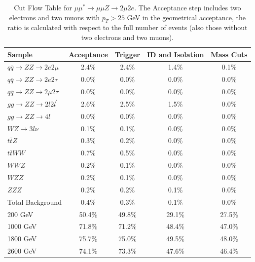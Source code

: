 \begin{table}[h]
\begin{center}
\begin{tabular}{|l|c|c|c|c|}
\hline
Sample & Acceptance & Trigger & ID and Isolation & Mass Cuts \\
\hline
\hline
$q\bar{q} \rightarrow ZZ \rightarrow 2e2\mu$ & 2.4\% & 2.4\% & 1.4\% & 0.1\% \\
$q\bar{q} \rightarrow ZZ \rightarrow 2e2\tau$ & 0.0\% & 0.0\% & 0.0\% & 0.0\% \\
$q\bar{q} \rightarrow ZZ \rightarrow 2\mu2\tau$ & 0.0\% & 0.0\% & 0.0\% & 0.0\% \\
$gg \rightarrow ZZ \rightarrow 2l2l^{\prime}$ & 2.6\% & 2.5\% & 1.5\% & 0.0\% \\
$gg \rightarrow ZZ \rightarrow 4l$ & 0.0\% & 0.0\% & 0.0\% & 0.0\% \\
$WZ \rightarrow 3l\nu$ & 0.1\% & 0.1\% & 0.0\% & 0.0\%\\
$t\bar{t}Z$ & 0.3\% & 0.2\% & 0.0\% & 0.0\% \\
$t\bar{t}WW$ & 0.7\% & 0.5\% & 0.0\% & 0.0\% \\
$WWZ$   & 0.2\% & 0.1\% & 0.0\% & 0.0\% \\
$WZZ$   & 0.2\% & 0.1\% & 0.0\% & 0.0\% \\
$ZZZ$   & 0.2\% & 0.2\% & 0.1\% & 0.0\% \\
\hline
\hline
Total Background & 0.4\% & 0.3\% & 0.1\% & 0.0\% \\
\hline
\hline
200 GeV & 50.4\% & 49.8\% & 29.1\% & 27.5\% \\
1000 GeV & 71.8\% & 71.2\% & 48.4\% & 47.0\% \\
1800 GeV & 75.7\% & 75.0\% & 49.5\% & 48.0\% \\
2600 GeV & 74.1\% & 73.3\% & 47.6\% & 46.4\% \\
\hline
\end{tabular}
\end{center}
\caption{\label{tab:CutFlow_2mu2e}Cut Flow Table for $\mu\mu^{*} \rightarrow \mu\mu Z \rightarrow 2\mu2e$. The Acceptance step includes two electrons and two muons with $p_{T} > 25$ GeV in the geometrical acceptance, the ratio is calculated with respect to the full number of events (also those without two electrons and two muons).}
\end{table}


